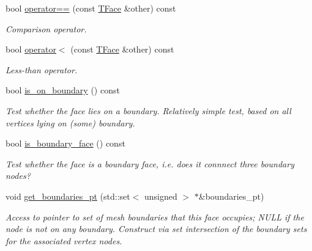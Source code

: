 \begin{DoxyCompactItemize}
bool \hyperlink{classoomph_1_1TFace_af7564b3292d27ca98a630564cf862b3a}{operator==} (const \hyperlink{classoomph_1_1TFace}{T\+Face} \&other) const
\begin{DoxyCompactList}\small\item\em Comparison operator. \end{DoxyCompactList}\item 
bool \hyperlink{classoomph_1_1TFace_aa99c3dec902942a67fea64ae6abecbac}{operator$<$} (const \hyperlink{classoomph_1_1TFace}{T\+Face} \&other) const
\begin{DoxyCompactList}\small\item\em Less-\/than operator. \end{DoxyCompactList}\item 
bool \hyperlink{classoomph_1_1TFace_a12c3aa641fc52d32d779de6c10a343be}{is\+\_\+on\+\_\+boundary} () const
\begin{DoxyCompactList}\small\item\em Test whether the face lies on a boundary. Relatively simple test, based on all vertices lying on (some) boundary. \end{DoxyCompactList}\item 
bool \hyperlink{classoomph_1_1TFace_ab36cf33b87bbadeb6d66e6583ae467c8}{is\+\_\+boundary\+\_\+face} () const
\begin{DoxyCompactList}\small\item\em Test whether the face is a boundary face, i.\+e. does it connnect three boundary nodes? \end{DoxyCompactList}\item 
void \hyperlink{classoomph_1_1TFace_a603fb029127a3899e988d23e00615c22}{get\+\_\+boundaries\+\_\+pt} (std\+::set$<$ unsigned $>$ $\ast$\&boundaries\+\_\+pt)
\begin{DoxyCompactList}\small\item\em Access to pointer to set of mesh boundaries that this face occupies; N\+U\+LL if the node is not on any boundary. Construct via set intersection of the boundary sets for the associated vertex nodes. \end{DoxyCompactList}\end{DoxyCompactItemize}

